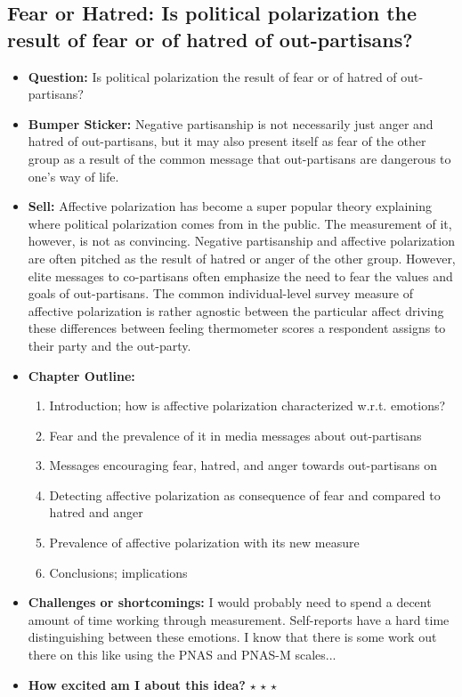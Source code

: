 \documentclass[12pt]{article}
\begin{document}
\subsection{Fear or Hatred: Is political polarization the result of fear or of hatred of out-partisans?}
    \begin{itemize}
        \item \textbf{Question:} Is political polarization the result of fear or of hatred of out-partisans?
        \item \textbf{Bumper Sticker:} Negative partisanship is not necessarily just anger and hatred of out-partisans, but it may also present itself as fear of the other group as a result of the common message that out-partisans are dangerous to one's way of life.
        \item \textbf{Sell:} Affective polarization has become a super popular theory explaining where political polarization comes from in the public. The measurement of it, however, is not as convincing. Negative partisanship and affective polarization are often pitched as the result of hatred or anger of the other group. However, elite messages to co-partisans often emphasize the need to fear the values and goals of out-partisans. The common individual-level survey measure of affective polarization is rather agnostic between the particular affect driving these differences between feeling thermometer scores a respondent assigns to their party and the out-party.
        \item \textbf{Chapter Outline:}
        \begin{enumerate}
            \item Introduction; how is affective polarization characterized w.r.t. emotions?
            \item Fear and the prevalence of it in media messages about out-partisans
            \item Messages encouraging fear, hatred, and anger towards out-partisans on 
            \item Detecting affective polarization as consequence of fear and compared to hatred and anger
            \item Prevalence of affective polarization with its new measure
            \item Conclusions; implications
        \end{enumerate}
        \item \textbf{Challenges or shortcomings:} I would probably need to spend a decent amount of time working through measurement. Self-reports have a hard time distinguishing between these emotions. I know that there is some work out there on this like using the PNAS and PNAS-M scales...
        \item \textbf{How excited am I about this idea?} $\star$ $\star$ $\star$
    \end{itemize}
\end{document}

